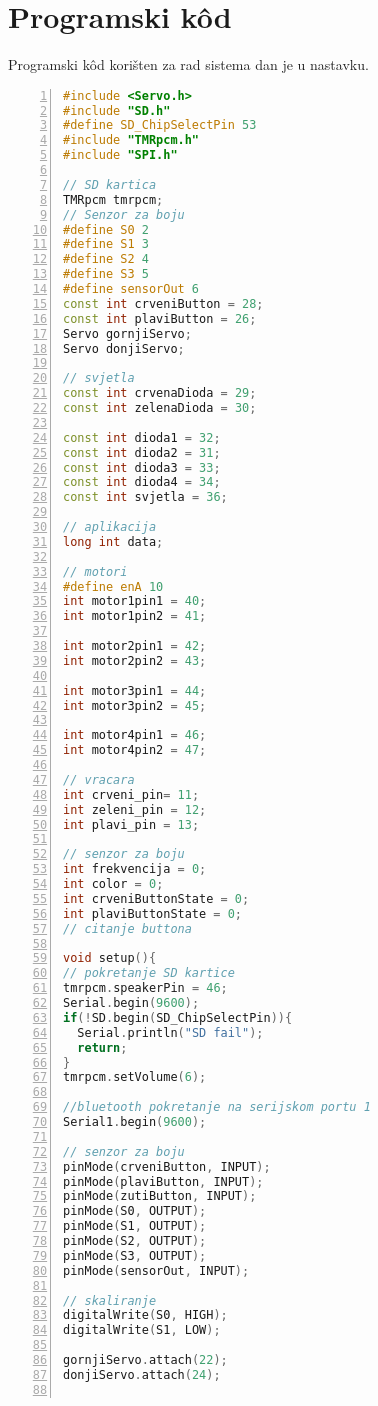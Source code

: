 \chapter{Programski kôd}

Programski kôd korišten za rad sistema dan je u nastavku.
\begin{lstlisting}[frame=single,language=C++,numbers=left, numberstyle=\tiny, xleftmargin=0.05\textwidth, xrightmargin=0.05\textwidth, basicstyle=\ttfamily\footnotesize]
#include <Servo.h>
#include "SD.h"
#define SD_ChipSelectPin 53
#include "TMRpcm.h"
#include "SPI.h"

// SD kartica
TMRpcm tmrpcm;
// Senzor za boju
#define S0 2
#define S1 3
#define S2 4
#define S3 5
#define sensorOut 6
const int crveniButton = 28;    
const int plaviButton = 26; 
Servo gornjiServo;
Servo donjiServo;

// svjetla
const int crvenaDioda = 29; 
const int zelenaDioda = 30; 

const int dioda1 = 32; 
const int dioda2 = 31; 
const int dioda3 = 33;
const int dioda4 = 34;
const int svjetla = 36;

// aplikacija
long int data;

// motori
#define enA 10
int motor1pin1 = 40;
int motor1pin2 = 41;

int motor2pin1 = 42;
int motor2pin2 = 43;

int motor3pin1 = 44;
int motor3pin2 = 45;

int motor4pin1 = 46;
int motor4pin2 = 47;

// vracara
int crveni_pin= 11;
int zeleni_pin = 12;
int plavi_pin = 13;

// senzor za boju
int frekvencija = 0;
int color = 0;
int crveniButtonState = 0;    
int plaviButtonState = 0; 
// citanje buttona

void setup(){
// pokretanje SD kartice
tmrpcm.speakerPin = 46;
Serial.begin(9600);
if(!SD.begin(SD_ChipSelectPin)){
  Serial.println("SD fail");
  return;
}
tmrpcm.setVolume(6);
    
//bluetooth pokretanje na serijskom portu 1
Serial1.begin(9600);

// senzor za boju
pinMode(crveniButton, INPUT);
pinMode(plaviButton, INPUT);
pinMode(zutiButton, INPUT);
pinMode(S0, OUTPUT);
pinMode(S1, OUTPUT);
pinMode(S2, OUTPUT);
pinMode(S3, OUTPUT);
pinMode(sensorOut, INPUT);

// skaliranje
digitalWrite(S0, HIGH);
digitalWrite(S1, LOW);

gornjiServo.attach(22);
donjiServo.attach(24);


\end{lstlisting}
